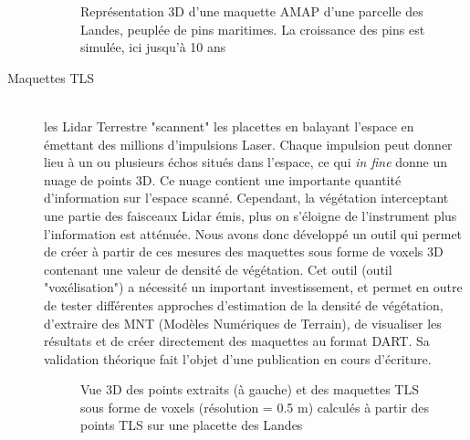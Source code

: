 \documentclass[a4paper,11pt]{article}
\begin{document}
\begin{description}
\begin{figure}[!htpb]
\centering
{}
\caption{Représentation 3D d'une maquette AMAP d'une parcelle des Landes, peuplée de pins maritimes. La croissance des pins est simulée, ici jusqu'à 10 ans}
\label{fig:maquetteAMAP}
\end{figure}

\item [Maquettes TLS]\hfill \\ les Lidar Terrestre "scannent" les placettes en balayant l'espace en émettant des millions d'impulsions Laser. Chaque impulsion peut donner lieu à un ou plusieurs échos situés dans l'espace, ce qui \textit{in fine} donne un nuage de points 3D. Ce nuage contient une importante quantité d'information sur l'espace scanné. Cependant, la végétation interceptant une partie des faisceaux Lidar émis, plus on s'éloigne de l'instrument plus l'information est atténuée. Nous avons donc développé un outil qui permet de créer à partir de ces mesures des maquettes sous forme de voxels 3D contenant une valeur de densité de végétation. Cet outil (outil "voxélisation") a nécessité un important investissement, et permet en outre de tester différentes approches d'estimation de la densité de végétation, d'extraire des MNT (Modèles Numériques de Terrain), de visualiser les résultats et de créer directement des maquettes au format DART. Sa validation théorique fait l'objet d'une publication en cours d'écriture.

\begin{figure}[!htpb]
\centering
{}
\caption{Vue 3D des points extraits (à gauche) et des maquettes TLS sous forme de voxels (résolution = 0.5 m) calculés à partir des points TLS sur une placette des Landes}
\label{fig:voxels}
\end{figure}
\end{description}
\end{document}
